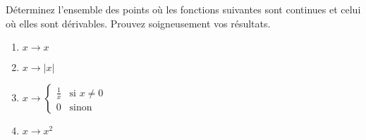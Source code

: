 
\begin{exercice}\label{exo0032}


Déterminez l'ensemble des points o\`u les fonctions suivantes sont continues et celui o\`u elles sont dérivables. Prouvez soigneusement vos résultats.
\begin{enumerate}
	\item $x \rightarrow x $
	\item $x \rightarrow |x| $
	\item $x \rightarrow \left\{ \begin{array}{ll} \frac{1}{x} & \mbox{si } x \not= 0 \\ 0 & \mbox{sinon} \end{array} \right.   $
	\item $x \rightarrow x^2  $
\end{enumerate}

\end{exercice}
